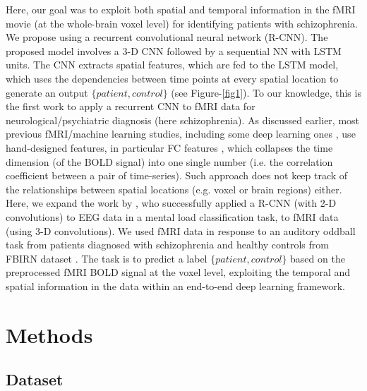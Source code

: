 \documentclass{article}
\begin{document}
Here, our goal was to exploit both spatial and temporal information in the fMRI movie (at the whole-brain voxel level) for identifying patients with schizophrenia. We propose using a recurrent convolutional neural network (R-CNN). The proposed model involves a 3-D CNN followed by a sequential NN with LSTM units. The CNN extracts spatial features, which are fed to the LSTM model, which uses the dependencies between time points at every spatial location to generate an output $\{patient, control\}$ (see Figure-\ref{fig1}). To our knowledge, this is the first work to apply a recurrent CNN to fMRI data for neurological/psychiatric diagnosis (here schizophrenia). As discussed earlier, most previous fMRI/machine learning studies, including some deep learning ones \citep{Kim2016}, use hand-designed features, in particular FC features \citep{Gheiratmand2017}, which collapses the time dimension (of the BOLD signal) into one single number (i.e. the correlation coefficient between a pair of time-series). Such approach does not keep track of the relationships between spatial locations (e.g. voxel or brain regions) either. Here, we expand the work by \citet{Bashivan2016}, who successfully applied a R-CNN (with 2-D convolutions) to EEG data in a mental load classification task, to fMRI data (using 3-D convolutions). %
We used fMRI data in response to an auditory oddball task from patients diagnosed with schizophrenia and healthy controls from FBIRN dataset \citep{Keator2016}. The task is to predict a label $\{patient, control\}$ based on the preprocessed fMRI BOLD signal at the voxel level, exploiting the temporal and spatial information in the data within an end-to-end deep learning framework.

\section{Methods}

\subsection{Dataset}
\end{document}
